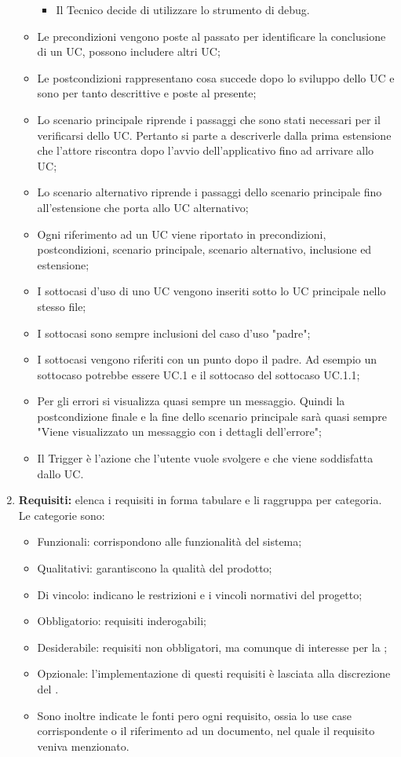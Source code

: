 \begin{enumerate}
\begin{itemize}
\begin{itemize}
      \item Il Tecnico decide di utilizzare lo strumento di debug.
    \end{itemize}
    \item Le precondizioni vengono poste al passato per identificare la conclusione di un UC, possono includere altri UC;
    \item Le postcondizioni rappresentano cosa succede dopo lo sviluppo dello UC e sono per tanto descrittive e poste al presente;
    \item Lo scenario principale riprende i passaggi che sono stati necessari per il verificarsi dello UC. Pertanto si parte a descriverle dalla prima estensione che l'attore riscontra dopo l'avvio dell'applicativo fino ad arrivare allo UC;
    \item Lo scenario alternativo riprende i passaggi dello scenario principale fino all'estensione che porta allo UC alternativo;
    \item Ogni riferimento ad un UC viene riportato in precondizioni, postcondizioni, scenario principale, scenario alternativo, inclusione ed estensione;
    \item I sottocasi d'uso di uno UC vengono inseriti sotto lo UC principale nello stesso file;
    \item I sottocasi sono sempre inclusioni del caso d'uso "padre";
    \item I sottocasi vengono riferiti con un punto dopo il padre. Ad esempio un sottocaso potrebbe essere UC.1 e il sottocaso del sottocaso UC.1.1;
    \item Per gli errori si visualizza quasi sempre un messaggio. Quindi la postcondizione finale e la fine dello scenario principale sarà quasi sempre "Viene visualizzato un messaggio con i dettagli dell'errore";
    \item Il Trigger è l'azione che l'utente vuole svolgere e che viene soddisfatta dallo UC.
  \end{itemize}
  \item \textbf{Requisiti:} elenca i requisiti in forma tabulare e li raggruppa per categoria. Le categorie sono:
  \begin{itemize}
    \item Funzionali: corrispondono alle funzionalità del sistema;
    \item Qualitativi: garantiscono la qualità del prodotto;
    \item Di vincolo: indicano le restrizioni e i vincoli normativi del progetto;
    \item Obbligatorio: requisiti inderogabili;
    \item Desiderabile: requisiti non obbligatori, ma comunque di interesse per la ;
    \item Opzionale: l'implementazione di questi requisiti è lasciata alla discrezione del .
    \item Sono inoltre indicate le fonti pero ogni requisito, ossia lo use case corrispondente o il riferimento ad un documento, nel quale il requisito veniva menzionato.
  \end{itemize}
\end{enumerate}

